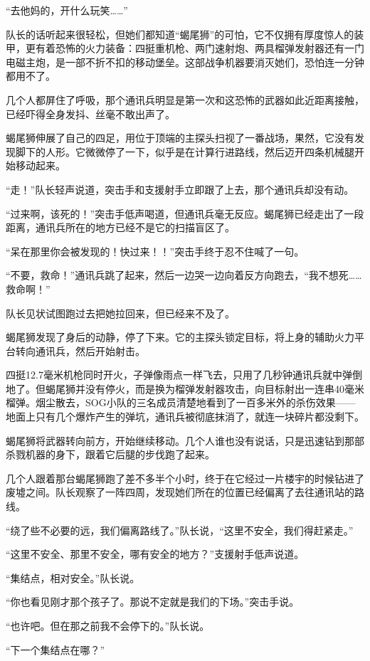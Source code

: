 “去他妈的，开什么玩笑……”

队长的话听起来很轻松，但她们都知道“蝎尾狮”的可怕，它不仅拥有厚度惊人的装甲，更有着恐怖的火力装备：四挺重机枪、两门速射炮、两具榴弹发射器还有一门电磁主炮，是一部不折不扣的移动堡垒。这部战争机器要消灭她们，恐怕连一分钟都用不了。

几个人都屏住了呼吸，那个通讯兵明显是第一次和这恐怖的武器如此近距离接触，已经吓得全身发抖、丝毫不敢出声了。

蝎尾狮伸展了自己的四足，用位于顶端的主探头扫视了一番战场，果然，它没有发现脚下的人形。它微微停了一下，似乎是在计算行进路线，然后迈开四条机械腿开始移动起来。

“走！”队长轻声说道，突击手和支援射手立即跟了上去，那个通讯兵却没有动。

“过来啊，该死的！”突击手低声喝道，但通讯兵毫无反应。蝎尾狮已经走出了一段距离，通讯兵所在的地方已经不是它的扫描盲区了。

“呆在那里你会被发现的！快过来！！”突击手终于忍不住喊了一句。

“不要，救命！”通讯兵跳了起来，然后一边哭一边向着反方向跑去，“我不想死……救命啊！”

队长见状试图跑过去把她拉回来，但已经来不及了。

蝎尾狮发现了身后的动静，停了下来。它的主探头锁定目标，将上身的辅助火力平台转向通讯兵，然后开始射击。

四挺12.7毫米机枪同时开火，子弹像雨点一样飞去，只用了几秒钟通讯兵就中弹倒地了。但蝎尾狮并没有停火，而是换为榴弹发射器攻击，向目标射出一连串40毫米榴弹。烟尘散去，SOG小队的三名成员清楚地看到了一百多米外的杀伤效果——地面上只有几个爆炸产生的弹坑，通讯兵被彻底抹消了，就连一块碎片都没剩下。

蝎尾狮将武器转向前方，开始继续移动。几个人谁也没有说话，只是迅速钻到那部杀戮机器的身下，跟着它后腿的步伐跑了起来。

几个人跟着那台蝎尾狮跑了差不多半个小时，终于在它经过一片楼宇的时候钻进了废墟之间。队长观察了一阵四周，发现她们所在的位置已经偏离了去往通讯站的路线。

“绕了些不必要的远，我们偏离路线了。”队长说，“这里不安全，我们得赶紧走。”

“这里不安全、那里不安全，哪有安全的地方？”支援射手低声说道。

“集结点，相对安全。”队长说。

“你也看见刚才那个孩子了。那说不定就是我们的下场。”突击手说。

“也许吧。但在那之前我不会停下的。”队长说。

“下一个集结点在哪？”

